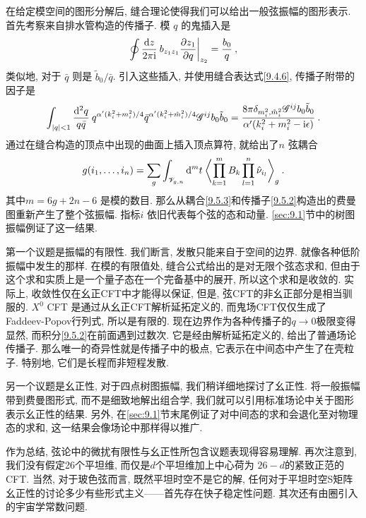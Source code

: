 在给定模空间的图形分解后, 缝合理论使得我们可以给出一般弦振幅的图形表示. 首先考察来自排水管构造的传播子. 模 $q$ 的鬼插入是
\begin{equation}
	\oint \frac{\mathrm{d} z}{2 \pi \mathrm{i}} \: b_{z_{1} z_{1}} \frac{\partial z_{1}}{\partial q}\biggr|_{z_{2}}=\frac{b_{0}}{q} \:, \label{9.5.1}
\end{equation}
类似地, 对于 $\bar{q}$ 则是 $\tilde{b}_{0} / \bar{q}$. 引入这些插入, 并使用缝合表达式\eqref{9.4.6}, 传播子附带的因子是
\begin{equation}
	\int_{|q|<1} \frac{\mathrm{d}^{2} q}{q \bar{q}} \: q^{\alpha^{\prime}(k_{i}^{2}+m_{i}^{2})/4} 
	\bar{q}^{\alpha^{\prime}(k_{i}^{2}+\tilde{m}_{i}^{2})/4} \mathscr{G}^{ij} b_{0} \tilde{b}_{0}
	= \frac{8 \pi \delta_{m_{i}^{2}, \tilde{m}_{i}^{2}} \mathscr{G}^{ij} b_{0} \tilde{b}_{0}}{\alpha^{\prime}(k_{i}^{2}+m_{i}^{2}-\mathrm{i} \epsilon)} \:. \label{9.5.2}
\end{equation}
通过在缝合构造的顶点中出现的曲面上插入顶点算符, 就给出了$n$ 弦耦合
\begin{equation}
	g(i_{1}, \ldots, i_{n}) = \sum_{g} \int_{\mathscr{V}_{g, n}} \mathrm{d}^{m} t  \:
	\biggl\langle\prod_{k=1}^{m} B_{k} \prod_{l=1}^{n} \hat{\nu}_{i_{l}}\biggr\rangle_{g} \:. \label{9.5.3}
\end{equation}
其中$m=6 g+2 n-6$ 是模的数目. 那么从耦合\eqref{9.5.3}和传播子\eqref{9.5.2}构造出的费曼图重新产生了整个弦振幅. 
指标$i$ 依旧代表每个弦的态和动量. \ref{sec:9.1}节中的树图振幅例证了这一结果.

第一个议题是振幅的有限性. 我们断言, 发散只能来自于空间的边界. 就像各种低阶振幅中发生的那样. 在模的有限值处, 缝合公式给出的是对无限个弦态求和, 
但由于这个求和实质上是一个量子态在一个完备基中的展开, 所以这个求和是收敛的. 实际上, 收敛性仅在幺正CFT中才能得以保证, 
但是, 弦CFT的非幺正部分是相当驯服的. $X^{0}$ CFT 是通过从幺正CFT解析延拓定义的, 而鬼场CFT仅仅生成了Faddeev-Popov行列式, 所以是有限的. 
现在边界作为各种传播子的$q \rightarrow 0$极限变得显然, 而积分\eqref{9.5.2}在前面遇到过数次. 它是经由解析延拓定义的, 给出了普通场论传播子. 
那么唯一的奇异性就是传播子中的极点, 它表示在中间态中产生了在壳粒子. 特别地, 它们是长程而非短程发散. 

另一个议题是幺正性, 对于四点树图振幅, 我们稍详细地探讨了幺正性. 将一般振幅带到费曼图形式, 而不是细致地解出组合学, 
我们就可以引用标准场论中关于图形表示幺正性的结果. 另外, 在\ref{sec:9.1}节末尾例证了对中间态的求和会退化至对物理态的求和, 
这一结果会像场论中那样得以推广. 

作为总结, 弦论中的微扰有限性与幺正性所包含议题表现得容易理解. 再次注意到, 我们没有假定26个平坦维, 而仅是$d$个平坦维加上中心荷为 $26-d$的紧致正范的CFT. 
当然, 对于玻色弦而言, 既然平坦时空不是它的解, 任何对于平坦时空S矩阵幺正性的讨论多少有些形式主义——首先存在快子稳定性问题. 其次还有由圈引入的宇宙学常数问题.

